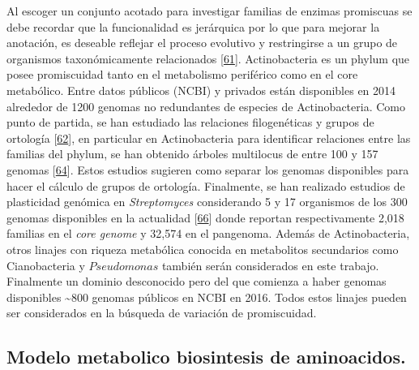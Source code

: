 \documentclass[12pt,twoside]{reedthesis}
\begin{document}
  Al escoger un conjunto acotado para investigar familias de enzimas
  promiscuas se debe recordar que la funcionalidad es jerárquica por lo
  que para mejorar la anotación, es deseable reflejar el proceso evolutivo
  y restringirse a un grupo de organismos taxonómicamente relacionados
  {[}\protect\hyperlink{ref-cruz-morales_phylogenomic_2016}{61}{]}.
  Actinobacteria es un phylum que posee promiscuidad tanto en el
  metabolismo periférico como en el core metabólico. Entre datos públicos
  (NCBI) y privados están disponibles en 2014 alrededor de 1200 genomas no
  redundantes de especies de Actinobacteria. Como punto de partida, se han
  estudiado las relaciones filogenéticas y grupos de ortología
  {[}\protect\hyperlink{ref-li_orthomcl_2003}{62}{]}, en particular en
  Actinobacteria para identificar relaciones entre las familias del
  phylum, se han obtenido árboles multilocus de entre 100 y 157 genomas
  {[}\protect\hyperlink{ref-gao_phylogenetic_2012}{64}{]}. Estos estudios
  sugieren como separar los genomas disponibles para hacer el cálculo de
  grupos de ortología. Finalmente, se han realizado estudios de
  plasticidad genómica en \emph{Streptomyces} considerando 5 y 17
  organismos de los 300 genomas disponibles en la actualidad
  {[}\protect\hyperlink{ref-zhou_genome_2012}{66}{]} donde reportan
  respectivamente 2,018 familias en el \emph{core genome} y 32,574 en el
  pangenoma. Además de Actinobacteria, otros linajes con riqueza
  metabólica conocida en metabolitos secundarios como Cianobacteria y
  \(Pseudomonas\) también serán considerados en este trabajo. Finalmente
  un dominio desconocido pero del que comienza a haber genomas disponibles
  \textasciitilde{}800 genomas públicos en NCBI en 2016. Todos estos
  linajes pueden ser considerados en la búsqueda de variación de
  promiscuidad.
  
  \subsection{Modelo metabolico biosintesis de
  aminoacidos.}\label{modelo-metabolico-biosintesis-de-aminoacidos.}
  
\end{document}
